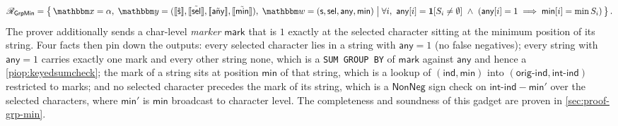 \else
\begin{displaymath}
\NPRelation_{\mathsf{GrpMin}} = \left\{\,
  \NPInstance = \alpha,\;
  \NPInstancey = (\Oracle{\hat{\strcol}}, \Oracle{\MLE{\mathsf{sel}}}, \Oracle{\MLE{\mathsf{any}}}, \Oracle{\MLE{\mathsf{min}}}),\;
  \NPWitness = (\strcol, \mathsf{sel}, \mathsf{any}, \mathsf{min})
  \;\middle|\;
    \forall i,\ \mathsf{any}[i] = \mathbf{1}[S_i \neq \emptyset]\ \wedge\ (\mathsf{any}[i] = 1 \implies \mathsf{min}[i] = \min S_i)
\,\right\}.
\end{displaymath}
\fi
The prover additionally sends a char-level \emph{marker} $\mathsf{mark}$ that is $1$ exactly at the selected character sitting at the minimum position of its string. Four facts then pin down the outputs: every selected character lies in a string with $\mathsf{any} = 1$ (no false negatives); every string with $\mathsf{any} = 1$ carries exactly one mark and every other string none, which is a \texttt{SUM GROUP BY} of $\mathsf{mark}$ against $\mathsf{any}$ and hence a \cref{piop:keyedsumcheck}; the mark of a string sits at position $\mathsf{min}$ of that string, which is a lookup of $(\mathsf{ind}, \mathsf{min})$ into $(\mathsf{orig\text{-}ind}, \mathsf{int\text{-}ind})$ restricted to marks; and no selected character precedes the mark of its string, which is a $\mathsf{NonNeg}$ sign check on $\mathsf{int\text{-}ind} - \mathsf{min}'$ over the selected characters, where $\mathsf{min}'$ is $\mathsf{min}$ broadcast to character level. The completeness and soundness of this gadget are proven in \cref{sec:proof-grp-min}.
